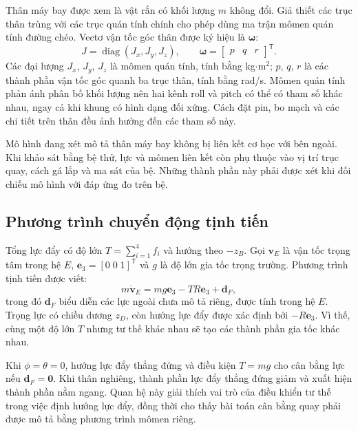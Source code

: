Thân máy bay được xem là vật rắn có khối lượng $m$ không đổi. Giả thiết các trục thân trùng với các trục quán tính chính cho phép dùng ma trận mômen quán tính đường chéo. Vectơ vận tốc góc thân được ký hiệu là $\symbf{\omega}$:
\begin{equation}
	J=\operatorname{diag}(J_x,J_y,J_z),\qquad
	\symbf{\omega}=\begin{bmatrix}p&q&r\end{bmatrix}^{\mathsf T}.
	\label{eq:background-inertia-angular-velocity}
\end{equation}
Các đại lượng $J_x$, $J_y$, $J_z$ là mômen quán tính, tính bằng kg$\cdot$m$^2$; $p$, $q$, $r$ là các thành phần vận tốc góc quanh ba trục thân, tính bằng rad/s. Mômen quán tính phản ánh phân bố khối lượng nên hai kênh roll và pitch có thể có tham số khác nhau, ngay cả khi khung có hình dạng đối xứng. Cách đặt pin, bo mạch và các chi tiết trên thân đều ảnh hưởng đến các tham số này.

Mô hình đang xét mô tả thân máy bay không bị liên kết cơ học với bên ngoài. Khi khảo sát bằng bệ thử, lực và mômen liên kết còn phụ thuộc vào vị trí trục quay, cách gá lắp và ma sát của bệ. Những thành phần này phải được xét khi đối chiếu mô hình với đáp ứng đo trên bệ.

\subsection{Phương trình chuyển động tịnh tiến}

Tổng lực đẩy có độ lớn $T=\sum_{i=1}^{4}f_i$ và hướng theo $-z_B$. Gọi $\symbf{v}_E$ là vận tốc trọng tâm trong hệ $E$, $\symbf{e}_3=[0\;0\;1]^{\mathsf T}$ và $g$ là độ lớn gia tốc trọng trường. Phương trình tịnh tiến được viết:
\begin{equation}
	m\dot{\symbf{v}}_E
	=mg\symbf{e}_3-TR\symbf{e}_3+\symbf{d}_F,
	\label{eq:background-translational-dynamics}
\end{equation}
trong đó $\symbf{d}_F$ biểu diễn các lực ngoài chưa mô tả riêng, được tính trong hệ $E$. Trọng lực có chiều dương $z_D$, còn hướng lực đẩy được xác định bởi $-R\symbf{e}_3$. Vì thế, cùng một độ lớn $T$ nhưng tư thế khác nhau sẽ tạo các thành phần gia tốc khác nhau.

Khi $\phi=\theta=0$, hướng lực đẩy thẳng đứng và điều kiện $T=mg$ cho cân bằng lực nếu $\symbf{d}_F=\symbf{0}$. Khi thân nghiêng, thành phần lực đẩy thẳng đứng giảm và xuất hiện thành phần nằm ngang. Quan hệ này giải thích vai trò của điều khiển tư thế trong việc định hướng lực đẩy, đồng thời cho thấy bài toán cân bằng quay phải được mô tả bằng phương trình mômen riêng.

